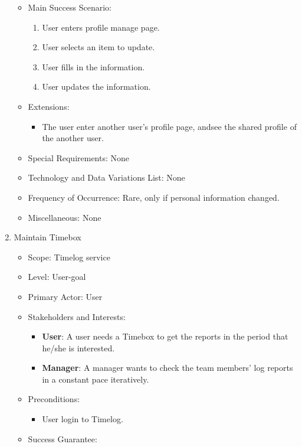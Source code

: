 \documentclass[12pt, a4paper]{article}
\begin{document}
\begin{CJK*}{UTF8}{bkai}
\begin{enumerate}
\begin{itemize}
          \item Main Success Scenario:
            \begin{enumerate}
              \item User enters profile manage page.
              \item User selects an item to update.
              \item User fills in the information.
              \item User updates the information.
            \end{enumerate}
          \item Extensions:
            \begin{itemize}
              \item The user enter another user's profile page, andsee the shared profile of the another user.
            \end{itemize}
          \item Special Requirements: None
          \item Technology and Data Variations List: None
          \item Frequency of Occurrence: Rare, only if personal information changed.
          \item Miscellaneous: None
        \end{itemize}
      \item Maintain Timebox
        \begin{itemize}
          \item Scope: Timelog service
          \item Level: User-goal
          \item Primary Actor: User
          \item Stakeholders and Interests:
            \begin{itemize}
              \item {\bf User}: A user needs a Timebox to get the reports in the period that he/she is interested.
              \item {\bf Manager}: A manager wants to check the team members' log reports in a constant pace iteratively.
            \end{itemize}
          \item Preconditions:
            \begin{itemize}
              \item User login to Timelog.
            \end{itemize}
          \item Success Guarantee:

\end{itemize}
\end{enumerate}
\end{CJK*}
\end{document}
